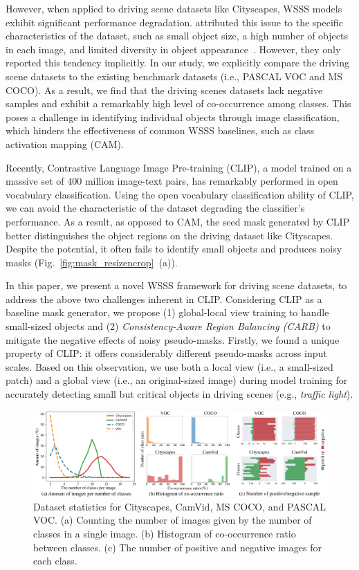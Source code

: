 \documentclass[letterpaper]{article} %
\def\eg{e.g.} \def\Eg{E.g.}
\def\ie{i.e.} \def\Ie{I.e.}
\begin{document}
However, when applied to driving scene datasets like Cityscapes, WSSS models exhibit significant performance degradation. \citeauthor{akiva2023single} attributed this issue to the specific characteristics of the dataset, such as small object size, a high number of objects in each image, and limited diversity in object appearance~\cite{akiva2023single}. However, they only reported this tendency implicitly. In our study, we explicitly compare the driving scene datasets to the existing benchmark datasets (\ie, PASCAL VOC and MS COCO). As a result, we find that the driving scenes datasets lack negative samples and exhibit a remarkably high level of co-occurrence among classes. This poses a challenge in identifying individual objects through image classification, which hinders the effectiveness of common WSSS baselines, such as class activation mapping (CAM).

Recently, Contrastive Language Image Pre-training (CLIP), a model trained on a massive set of 400 million image-text pairs, has remarkably performed in open vocabulary classification. Using the open vocabulary classification ability of CLIP, we can avoid the characteristic of the dataset degrading the classifier's performance. As a result, as opposed to CAM, the seed mask generated by CLIP better distinguishes the object regions on the driving dataset like Cityscapes. Despite the potential, it often fails to identify small objects and produces noisy masks (Fig.~\ref{fig:mask_resizencrop}~(a)).

In this paper, we present a novel WSSS framework for driving scene datasets, to address the above two challenges inherent in CLIP. Considering CLIP as a baseline mask generator, we propose (1) global-local view training to handle small-sized objects and (2) \textit{Consistency-Aware Region Balancing (CARB)} to mitigate the negative effects of noisy pseudo-masks. Firstly, we found a unique property of CLIP: it offers considerably different pseudo-masks across input scales. Based on this observation, we use both a local view (\ie, a small-sized patch) and a global view (\ie, an original-sized image) during model training for accurately detecting small but critical objects in driving scenes (\eg, \textit{traffic light}).

\begin{figure}[t]
\begin{center}
\includegraphics[width=17cm]{figures/fig_dataset.pdf}
\end{center}
\caption{Dataset statistics for Cityscapes, CamVid, MS COCO, and PASCAL VOC. (a) Counting the number of images given by the number of classes in a single image. (b) Histogram of co-occurrence ratio between classes. (c) The number of positive and negative images for each class.}
\label{fig:dataset}
\end{figure}
\end{document}
